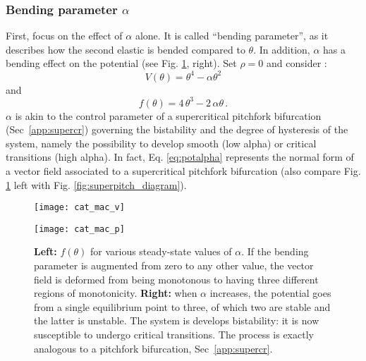 \tocless\subsubsection{Bending parameter $\alpha$}
First, focus on the effect of $\alpha$ alone. It is called ``bending parameter'', as it describes how the second elastic is bended compared to $\theta$. In addition, $\alpha$ has a bending effect on the potential (see Fig. \ref{fig:cm_bending}, right). Set $\rho = 0$ and consider :
\begin{equation}
	V(\theta) = \theta^4 - \alpha \theta^2
\end{equation}
and 
\begin{equation}
	f(\theta) = 4 \, \theta^3 - 2 \, \alpha \theta \, .
	\label{eq:potalpha}
\end{equation}
$\alpha$ is akin to the control parameter of a supercritical pitchfork bifurcation (Sec~\ref{app:supercr}) governing the bistability and the degree of hysteresis of the system, namely the possibility to develop smooth (low alpha) or critical transitions (high alpha). In fact, Eq. \ref{eq:potalpha} represents the normal form of a vector field associated to a supercritical pitchfork bifurcation (also compare Fig. \ref{fig:cm_bending} left with Fig. \ref{fig:superpitch_diagram}).

\begin{figure}[h]
	\centering
	\begin{minipage}[c]{0.48\textwidth}
		\texttt{[image: cat\_mac\_v]}
		\renewcommand{\figurename}{Fig.}
	\end{minipage}
	\hspace{0.05cm}
	\begin{minipage}[c]{0.48\textwidth}
		\texttt{[image: cat\_mac\_p]}
		\renewcommand{\figurename}{Fig.}
	\end{minipage} 
	\caption{\small \textbf{Left:} $f(\theta)$ for various steady-state values of $\alpha$. If the bending parameter is augmented from zero to any other value, the vector field is deformed from being monotonous to having three different regions of monotonicity. \textbf{Right:} when $\alpha$ increases, the potential goes from a single equilibrium point to three, of which two are stable and the latter is unstable. The system is develops bistability: it is now susceptible to undergo critical transitions. The process is exactly analogous to a pitchfork bifurcation, Sec~\ref{app:supercr}.}
	\label{fig:cm_bending}
\end{figure}



